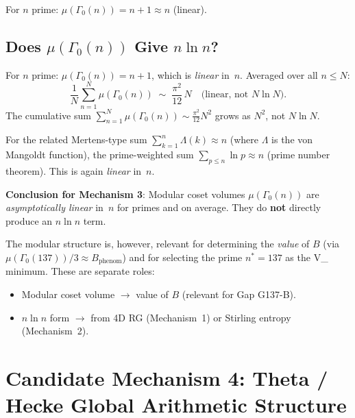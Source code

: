 \documentclass[12pt,a4paper]{article}
\theoremstyle{definition}
\theoremstyle{remark}
\begin{document}
For $n$ prime: $\mu(\Gamma_0(n)) = n + 1 \approx n$ (linear).

\subsection{Does $\mu(\Gamma_0(n))$ Give $n\ln n$?}
\label{ssec:nlogn:mod_nlogn}

For $n$ prime: $\mu(\Gamma_0(n)) = n + 1$, which is \emph{linear} in~$n$.
Averaged over all $n \le N$:
\begin{equation}
  \frac{1}{N}\sum_{n=1}^{N}\mu(\Gamma_0(n))
  \;\sim\; \frac{\pi^2}{12}\,N
  \quad\text{(linear, not }N\ln N\text{)}.
  \label{eq:nlogn:mod_average}
\end{equation}
The cumulative sum $\sum_{n=1}^{N}\mu(\Gamma_0(n)) \sim \tfrac{\pi^2}{12}N^2$
grows as $N^2$, not $N\ln N$.

For the related Mertens-type sum $\sum_{k=1}^{n}\Lambda(k) \approx n$
(where $\Lambda$ is the von Mangoldt function), the prime-weighted sum
$\sum_{p \le n}\ln p \approx n$ (prime number theorem).  This is again
\emph{linear} in~$n$.

\begin{resultbox}
\textbf{Conclusion for Mechanism 3}: Modular coset volumes $\mu(\Gamma_0(n))$
are \emph{asymptotically linear} in~$n$ for primes and on average.  They do
\textbf{not} directly produce an $n\ln n$ term.

The modular structure is, however, relevant for determining the \emph{value} of
$B$ (via $\mu(\Gamma_0(137))/3 \approx B_\mathrm{phenom}$) and for selecting the
prime $n^* = 137$ as the V_ minimum.  These are separate roles:
\begin{itemize}
  \item Modular coset volume $\to$ value of $B$ (relevant for Gap G137-B).
  \item $n\ln n$ form $\to$ from 4D RG (Mechanism~1) or Stirling entropy
        (Mechanism~2).
\end{itemize}
\end{resultbox}

\section{Candidate Mechanism 4: Theta / Hecke Global Arithmetic Structure}
\label{sec:nlogn:hecke}
\end{document}
